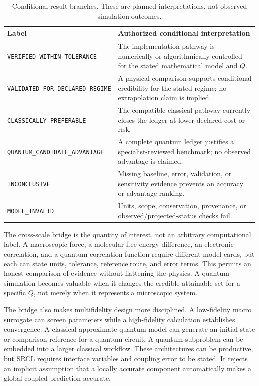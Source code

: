 \documentclass[conference]{../../../../Conference-LaTeX-template_10-17-19/IEEEtran}
\begin{document}
\begin{table}[!t]
\caption{Conditional result branches. These are planned interpretations, not observed simulation outcomes.}
\label{tab:branches}
\centering
\footnotesize
\begin{tabularx}{\columnwidth}{lY}
\toprule
Label & Authorized conditional interpretation \\
\midrule
\texttt{VERIFIED\_WITHIN\_TOLERANCE} & The implementation pathway is numerically or algorithmically controlled for the stated mathematical model and $Q$. \\
\texttt{VALIDATED\_FOR\_DECLARED\_REGIME} & A physical comparison supports conditional credibility for the stated regime; no extrapolation claim is implied. \\
\texttt{CLASSICALLY\_PREFERABLE} & The compatible classical pathway currently closes the ledger at lower declared cost or risk. \\
\texttt{QUANTUM\_CANDIDATE\_ADVANTAGE} & A complete quantum ledger justifies a specialist-reviewed benchmark; no observed advantage is claimed. \\
\texttt{INCONCLUSIVE} & Missing baseline, error, validation, or sensitivity evidence prevents an accuracy or advantage ranking. \\
\texttt{MODEL\_INVALID} & Units, scope, conservation, provenance, or observed/projected-status checks fail. \\
\bottomrule
\end{tabularx}
\end{table}

The cross-scale bridge is the quantity of interest, not an arbitrary computational label. A macroscopic force, a molecular free-energy difference, an electronic correlation, and a quantum correlation function require different model cards, but each can state units, tolerance, reference route, and error terms. This permits an honest comparison of evidence without flattening the physics. A quantum simulation becomes valuable when it changes the credible attainable set for a specific $Q$, not merely when it represents a microscopic system.

The bridge also makes multifidelity design more disciplined. A low-fidelity macro surrogate can screen parameters while a high-fidelity calculation establishes convergence. A classical approximate quantum model can generate an initial state or comparison reference for a quantum circuit. A quantum subproblem can be embedded into a larger classical workflow. These architectures can be productive, but SRCL requires interface variables and coupling error to be stated. It rejects an implicit assumption that a locally accurate component automatically makes a global coupled prediction accurate.
\end{document}

